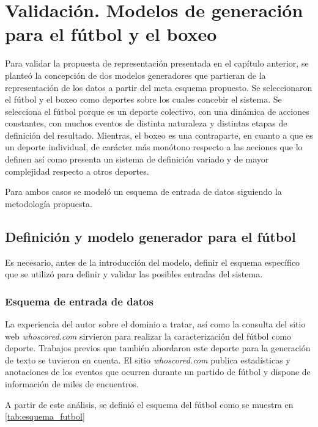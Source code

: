 \chapter{Validación. Modelos de generación para el fútbol y el boxeo}\label{chapter:validation}

    Para validar la propuesta de representación presentada en el capítulo anterior, se planteó la concepción de 
dos modelos generadores que partieran de la representación de los datos a partir del meta esquema propuesto. Se seleccionaron 
el fútbol y el boxeo como deportes sobre los cuales concebir el sistema. Se selecciona el fútbol porque es un deporte colectivo, 
con una dinámica de acciones constantes,  con muchos eventos de distinta naturaleza y distintas etapas de definición del resultado. 
Mientras, el boxeo es una contraparte, en cuanto a que es un deporte individual, de carácter más monótono respecto a las acciones que 
lo definen así como presenta un sistema de definición variado y de mayor complejidad respecto a otros deportes.  

    Para ambos casos se modeló un esquema de entrada de datos siguiendo la metodología propuesta.

\section{Definición y modelo generador para el fútbol}

    Es necesario, antes de la introducción del modelo, definir el esquema específico que se utilizó para 
definir y validar las posibles entradas del sistema.

\subsection{Esquema de entrada de datos}

    La experiencia del autor sobre el dominio a tratar, así como la consulta del sitio web \textit{whoscored.com} sirvieron para realizar la caracterización del 
fútbol como deporte. Trabajos previos que también abordaron este deporte para la generación de texto  se tuvieron en cuenta. 
El sitio \textit{whoscored.com} publica estadísticas y anotaciones de los eventos que ocurren durante un partido de fútbol y dispone de información de miles de encuentros.

A partir de este análisis, se definió el esquema del fútbol como se muestra en \ref{tab:esquema_futbol}

